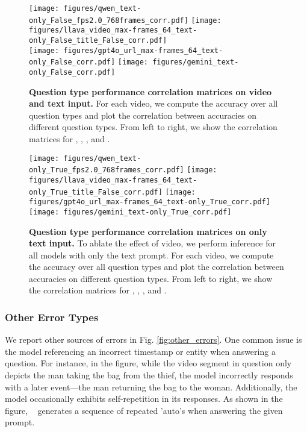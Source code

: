 \begin{figure*}[ht!]
    \centering
    \texttt{[image: figures/qwen\_text-only\_False\_fps2.0\_768frames\_corr.pdf]}
    \texttt{[image: figures/llava\_video\_max-frames\_64\_text-only\_False\_title\_False\_corr.pdf]} \\
    \texttt{[image: figures/gpt4o\_url\_max-frames\_64\_text-only\_False\_corr.pdf]}
    \texttt{[image: figures/gemini\_text-only\_False\_corr.pdf]}
    \caption{\textbf{Question type performance correlation matrices on video and text input.} For each video, we compute the accuracy over all question types and plot the correlation between accuracies on different question types. From left to right, we show the correlation matrices for {\qwen}, {\llava}, {\gemini}, and {\gpt}.   }
    \label{fig:vl_corr}
\end{figure*}

\begin{figure*}[ht!]
    \centering
    \texttt{[image: figures/qwen\_text-only\_True\_fps2.0\_768frames\_corr.pdf]}
    \texttt{[image: figures/llava\_video\_max-frames\_64\_text-only\_True\_title\_False\_corr.pdf]}
    \texttt{[image: figures/gpt4o\_url\_max-frames\_64\_text-only\_True\_corr.pdf]}
    \texttt{[image: figures/gemini\_text-only\_True\_corr.pdf]}
    \caption{\textbf{Question type performance correlation matrices on only text input.} To ablate the effect of video, we perform inference for all models with only the text prompt. For each video, we compute the accuracy over all question types and plot the correlation between accuracies on different question types. From left to right, we show the correlation matrices for {\qwen}, {\llava}, {\gemini}, and {\gpt}.   }
    \label{fig:l_corr}
\end{figure*}
\subsubsection{Other Error Types}
We report other sources of errors in Fig. \ref{fig:other_errors}. One common issue is the model referencing an incorrect timestamp or entity when answering a question. For instance, in the figure, while the video segment in question only depicts the man taking the bag from the thief, the model incorrectly responds with a later event—the man returning the bag to the woman. Additionally, the model occasionally exhibits self-repetition in its responses. As shown in the figure, \gemini~ generates a sequence of repeated 'auto's when answering the given prompt.


